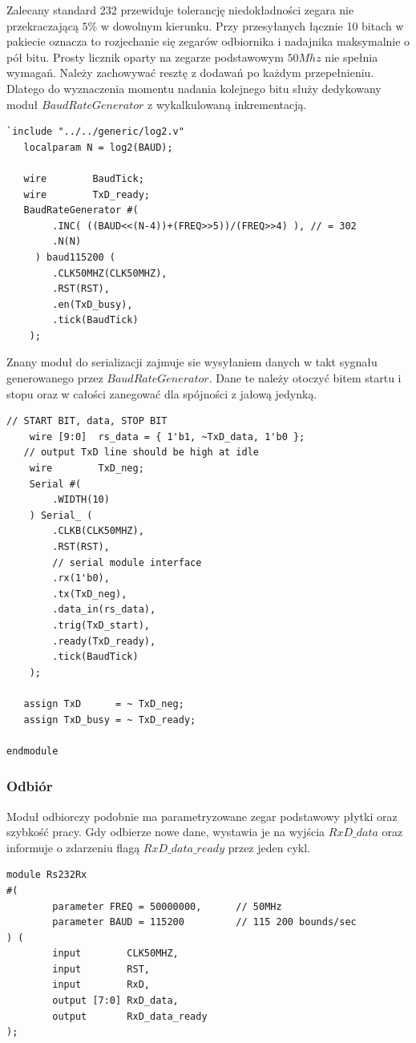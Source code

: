\documentclass[a4paper,12pt]{article}
\begin{document}
Zalecany standard 232 przewiduje tolerancję niedokładności zegara nie przekraczającą $5\%$ w dowolnym kierunku. Przy przesyłanych łącznie 10 bitach w pakiecie oznacza to rozjechanie się zegarów odbiornika i nadajnika maksymalnie o pół bitu. Prosty licznik oparty na zegarze podstawowym $50Mhz$ nie spełnia wymagań. Należy zachowywać resztę z dodawań po każdym przepełnieniu. Dlatego do wyznaczenia momentu nadania kolejnego bitu służy dedykowany moduł $BaudRateGenerator$ z wykalkulowaną inkrementacją.
\begin{lstlisting}[label=Rs232Tx,caption=Rs232Tx.v,firstnumber=14]
   `include "../../generic/log2.v"
   localparam N = log2(BAUD);

   wire        BaudTick;
   wire        TxD_ready;
   BaudRateGenerator #(
        .INC( ((BAUD<<(N-4))+(FREQ>>5))/(FREQ>>4) ), // = 302
        .N(N)
     ) baud115200 (
        .CLK50MHZ(CLK50MHZ),
        .RST(RST),
        .en(TxD_busy),
        .tick(BaudTick)
    );
\end{lstlisting}

Znany moduł do serializacji zajmuje sie wysyłaniem danych w takt sygnału generowanego przez $BaudRateGenerator$. Dane te należy otoczyć bitem startu i stopu oraz w całości zanegować dla spójności z jałową jedynką.
\begin{lstlisting}[label=Rs232Tx,caption=Rs232Tx.v,firstnumber=29]
    // START BIT, data, STOP BIT
    wire [9:0]  rs_data = { 1'b1, ~TxD_data, 1'b0 };
   // output TxD line should be high at idle
    wire        TxD_neg;
    Serial #(
        .WIDTH(10)
    ) Serial_ (
        .CLKB(CLK50MHZ),
        .RST(RST),
        // serial module interface
        .rx(1'b0),
        .tx(TxD_neg),
        .data_in(rs_data),
        .trig(TxD_start),
        .ready(TxD_ready),
        .tick(BaudTick)
    );

   assign TxD      = ~ TxD_neg;
   assign TxD_busy = ~ TxD_ready;

endmodule
\end{lstlisting}


\subsubsection{Odbiór}
Moduł odbiorczy podobnie ma parametryzowane zegar podstawowy płytki oraz szybkość pracy. Gdy odbierze nowe dane, wystawia je na wyjścia $RxD\_data$ oraz informuje o zdarzeniu flagą $RxD\_data\_ready$ przez jeden cykl.
\begin{lstlisting}[label=Rs232Rx,caption=Rs232Rx.v]
module Rs232Rx
#(
        parameter FREQ = 50000000,      // 50MHz
        parameter BAUD = 115200         // 115 200 bounds/sec
) (
        input        CLK50MHZ,
        input        RST,
        input        RxD,
        output [7:0] RxD_data,
        output       RxD_data_ready
);
\end{lstlisting}
\end{document}
